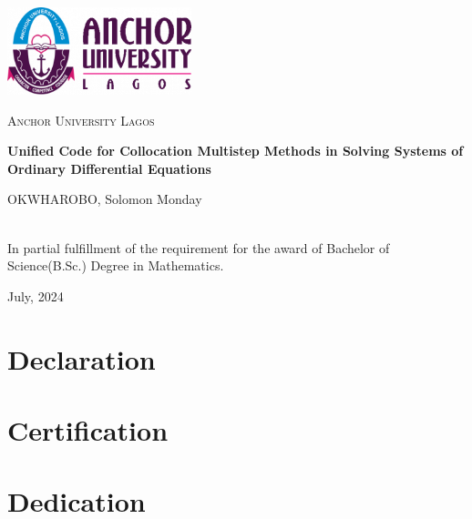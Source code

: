 \documentclass[a4paper]{report}
\begin{document}
\fontsize{13}{15}\selectfont
\begin{titlepage}
    \centering
    \vspace*{1cm}
    \includegraphics[width=0.4\textwidth]{aul_logo.png}\par
    \vspace{1.5cm}
    {\scshape\LARGE Anchor University Lagos \par}
    \vspace{1cm}
    \vspace{1.5cm}
    {\huge\bfseries Unified Code for Collocation Multistep Methods in Solving Systems of Ordinary Differential Equations\par}
    \vspace{2cm}
    {\Large OKWHAROBO, Solomon Monday\par}
    \vfill
   
     \\
    In partial fulfillment of the requirement for the award of Bachelor of Science(B.Sc.) Degree in Mathematics.
 
    \vfill
 
    {\large July, 2024 \par}
 \end{titlepage}


\clearpage

\chapter*{Declaration}


\chapter*{Certification}


\chapter*{Dedication}

\end{document}
